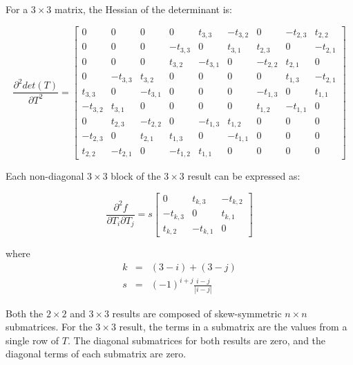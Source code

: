 \documentclass{report}
\begin{document}
For a $3 \times 3$ matrix, the Hessian of the determinant is:

\begin{equation}
\frac{\partial^2 det(T)}{\partial T^2} =
\left[ \begin{array}{ccccccccc}
 0 & 0 & 0 & 0 & t_{3,3} & -t_{3,2} & 0 & -t_{2,3} & t_{2,2} \\
 0 & 0 & 0 & -t_{3,3} & 0 & t_{3,1} & t_{2,3} & 0 & -t_{2,1} \\
 0 & 0 & 0 & t_{3,2} & -t_{3,1} & 0 & -t_{2,2} & t_{2,1} & 0 \\
 0 & -t_{3,3} & t_{3,2} & 0 & 0 & 0 & 0 & t_{1,3} & -t_{2,1} \\
 t_{3,3} & 0 & -t_{3,1} & 0 & 0 & 0 & -t_{1,3} & 0 & t_{1,1} \\
 -t_{3,2} & t_{3,1} & 0 & 0 & 0 & 0 & t_{1,2} & -t_{1,1} & 0 \\
 0 & t_{2,3} & -t_{2,2} & 0 & -t_{1,3} & t_{1,2} & 0 & 0 & 0 \\
 -t_{2,3} & 0 & t_{2,1} & t_{1,3} & 0 & -t_{1,1} & 0 & 0 & 0 \\
 t_{2,2} & -t_{2,1} & 0 & -t_{1,2} & t_{1,1} & 0 & 0 & 0 & 0
\end{array} \right]
\end{equation}

Each non-diagonal $3 \times 3$ block of the $3 \times 3$ result can be expressed as:

\begin{equation}
\frac{\partial^2 f}{\partial T_i \partial T_j}
 = s\left[\begin{array}{ccc}
0 & t_{k,3} & -t_{k,2} \\
-t_{k,3} & 0 & t_{k,1} \\
t_{k,2} & -t_{k,1} & 0 
\end{array}\right]\end{equation}

where 
\begin{eqnarray}
k &=& (3-i) + (3-j) \\
s &=& (-1)^{i+j}\frac{i-j}{|i-j|}
\end{eqnarray}

Both the $2 \times 2$ and $3 \times 3$ results are composed of skew-symmetric $n \times n$ submatrices.  For the $3 \times 3$ result, the terms in a submatrix are the values from a single row of $T$.  The diagonal submatrices for both results are zero, and the diagonal terms of each submatrix are zero.
\end{document}
